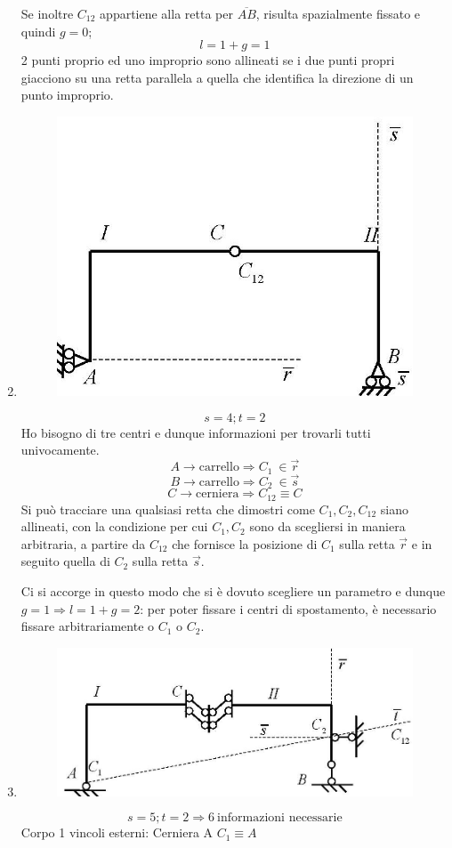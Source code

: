 \documentclass{article}
\begin{document}
\begin{adjustwidth}{2in}{}
\begin{enumerate}
Se inoltre $C_{12}$ appartiene alla retta per $\overline{AB}$, risulta spazialmente fissato e quindi $g=0$;
\[
l = 1+ g = 1
\] 
2 punti proprio ed uno improprio sono allineati se i due punti propri giacciono su una retta parallela a quella che identifica la direzione di un punto improprio.  

\newpage


\item \mbox{}
\begin{figure}[H]
	\centering
	\includegraphics[width=0.25\linewidth]{immagini/1.PARTE3_Pagina_16 (2)}
\end{figure}
\[s=4; t = 2\]
Ho bisogno di tre centri e dunque  informazioni per trovarli tutti univocamente.
\[
A \rightarrow \text{carrello} \Rightarrow C_1 ~ \in  \vec{r}
\]
\[
B \rightarrow \text{carrello} \Rightarrow C_2 ~ \in  \vec{s}
\]
\[
C \rightarrow \text{cerniera} \Rightarrow C_12 \equiv C
\]
Si può tracciare una qualsiasi retta che dimostri come $C_1, C_2, C_{12}$ siano allineati, con la condizione per cui $C_1, C_2$ sono da scegliersi in maniera arbitraria, a partire da $C_{12}$ che fornisce la posizione di $C_1$ sulla retta $\vec{r}$ e in seguito quella di $C_2$ sulla retta $\vec{s}$.

Ci si accorge in questo modo che si è dovuto scegliere un parametro e dunque $g = 1 \Rightarrow l = 1+g = 2$: per poter fissare i centri di spostamento, è necessario fissare arbitrariamente o $C_1$ o $C_2$. 

\newpage

\item \mbox{}

\begin{figure}[H]
	\centering
	\includegraphics[width=0.4\linewidth]{immagini/1.PARTE3_Pagina_16}
\end{figure}
\[s = 5; t = 2 \Rightarrow 6 ~ \text{informazioni necessarie}\]
Corpo 1 vincoli esterni: Cerniera A $C_1 \equiv A$ \newline


\end{enumerate}
\end{adjustwidth}
\end{document}
